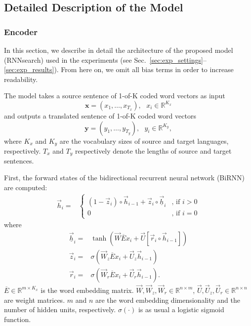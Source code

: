 \documentclass{article} %
\newcommand{\vect}[1]{\mathbf{#1}}
\newcommand{\vx}[0]{\vect{x}}
\newcommand{\vy}[0]{\vect{y}}
\newcommand{\ora}{\overrightarrow}
\newcommand{\ov}{\overline}
\begin{document}
\subsection{Detailed Description of the Model}
\subsubsection{Encoder}

In this section, we describe in detail the architecture of the proposed model
(RNNsearch) used in the experiments (see
Sec.~\ref{sec:exp_settings}--\ref{sec:exp_results}).  From here on, we omit all
bias terms in order to increase readability.

The model takes a source sentence of 1-of-K coded word vectors as input
\[
    \vx = (x_1, \ldots, x_{T_x}),\mbox{ }x_i \in \mathbb{R}^{K_x}
\]
and outputs a translated sentence of 1-of-K coded word vectors
\[
    \vy = (y_1, \ldots, y_{T_y}),\mbox{ }y_i \in \mathbb{R}^{K_y},
\]
where $K_x$ and $K_y$ are the vocabulary sizes of source and target languages,
respectively. $T_x$ and $T_y$ respectively denote the lengths of source and
target sentences.

First, the forward states of the bidirectional recurrent neural network (BiRNN)
are computed:
\begin{align*}
    \ora{h}_i =& 
    \begin{cases}
        (1 - \ora{z}_i) \circ \ora{h}_{i-1}  + \ora{z}_i \circ \ora{\underline{h}}_{i} &\mbox{, if }i > 0 \\
        0 &\mbox{, if }i = 0
    \end{cases}
\end{align*}
where
\begin{align*}
    \ora{\underline{h}}_i =& \tanh \left( \ora{W} \ov{E} x_i + \ora{U}\left[ \ora{r}_i \circ \ora{h}_{i-1} \right] \right) \\
    \ora{z}_i =& \sigma\left( \ora{W}_z \ov{E} x_i + \ora{U}_z \ora{h}_{i-1} \right) \\
    \ora{r}_i =& \sigma\left( \ora{W}_r \ov{E} x_i + \ora{U}_r \ora{h}_{i-1} \right).
\end{align*}
$\overline{E} \in \mathbb{R}^{m\times K_x}$ is the word embedding matrix.
$\ora{W}, \ora{W}_z, \ora{W}_r \in \mathbb{R}^{n\times m}$, $\ora{U}, \ora{U}_z,
\ora{U}_r \in \mathbb{R}^{n\times n}$ are weight matrices. $m$ and $n$ are the word
embedding dimensionality and the number of hidden units, respectively. 
$\sigma(\cdot)$ is as usual a logistic sigmoid function.
\end{document}

